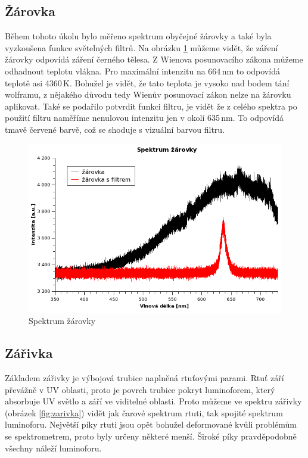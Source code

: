 \documentclass[12pt]{article}
\begin{document}
\clearpage

\subsection{Žárovka}
Během tohoto úkolu bylo měřeno spektrum obyčejné žárovky a také byla vyzkoušena funkce světelných filtrů. Na obrázku \ref{fig:zarovka} můžeme vidět, že záření žárovky odpovídá záření černého tělesa. Z Wienova posunovacího zákona můžeme odhadnout teplotu vlákna. Pro maximální intenzitu na 664\,nm to odpovídá teplotě asi 4360\,K. Bohužel je vidět, že tato teplota je vysoko nad bodem tání wolframu, z nějakého důvodu tedy Wienův posunovací zákon nelze na žárovku aplikovat. Také se podařilo potvrdit funkci filtru, je vidět že z celého spektra po použití filtru naměříme nenulovou intenzitu jen v okolí 635\,nm. To odpovídá tmavě červené barvě, což se shoduje s vizuální barvou filtru.

\begin{figure}[h!]
  \centering
  \includegraphics[width=13cm]{img/zarovka.png}
  \caption{Spektrum žárovky}
  \label{fig:zarovka} 
\end{figure}

\subsection{Zářivka}
Základem zářivky je výbojová trubice naplněná rtuťovými parami. Rtuť září převážně v UV oblasti, proto je povrch trubice pokryt luminoforem, který absorbuje UV světlo a září ve viditelné oblasti. Proto můžeme ve spektru zářivky (obrázek \ref{fig:zarivka}) vidět jak čarové spektrum rtuti, tak spojité spektrum luminoforu. Největší píky rtuti jsou opět bohužel deformované kvůli problémům se spektrometrem, proto byly určeny některé menší. Široké píky pravděpodobně všechny náleží luminoforu.
\end{document}
